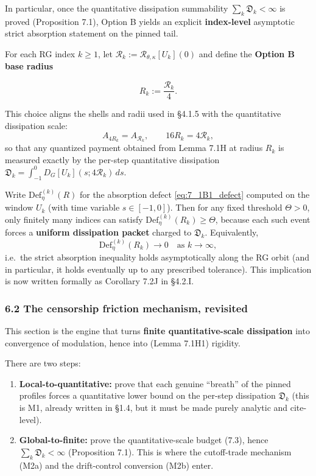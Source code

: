 \documentclass[
  11pt,
]{article}
\begin{document}
In particular, once the quantitative dissipation summability \(\sum_k\mathfrak D_k<\infty\) is proved (Proposition 7.1), Option B yields an explicit \textbf{index-level} asymptotic strict absorption statement on the pinned tail.

For each RG index \(k\ge1\), let \(\mathcal R_k:=\mathcal R_{\theta,\kappa}[U_k](0)\) and define the \textbf{Option B base radius}

\begin{equation}
R_k:=\frac{\mathcal R_k}{4}.
\tag{7.2B0}\label{eq:7_2B0_Rk_def}
\end{equation}

This choice aligns the shells and radii used in §4.1.5 with the quantitative dissipation scale: \[
A_{4R_k}=A_{\mathcal R_k},\qquad 16R_k = 4\mathcal R_k,
\] so that any quantized payment obtained from Lemma 7.1H at radius \(R_k\) is measured exactly by the per-step quantitative dissipation \(\mathfrak D_k=\int_{-1}^{0}D_G[U_k](s;4\mathcal R_k)\,ds\).

Write \(\mathrm{Def}^{(k)}_{\eta}(R)\) for the absorption defect \eqref{eq:7_1B1_defect} computed on the window \(U_k\) (with time variable \(s\in[-1,0]\)). Then for any fixed threshold \(\Theta>0\), only finitely many indices can satisfy \(\mathrm{Def}^{(k)}_{\eta}(R_k)\ge \Theta\), because each such event forces a \textbf{uniform dissipation packet} charged to \(\mathfrak D_k\). Equivalently, \[
\mathrm{Def}^{(k)}_{\eta}(R_k)\to 0\quad\text{as }k\to\infty,
\] i.e.~the strict absorption inequality holds asymptotically along the RG orbit (and in particular, it holds eventually up to any prescribed tolerance). This implication is now written formally as Corollary 7.2J in §4.2.I.

\hypertarget{the-censorship-friction-mechanism-revisited}{%
\subsubsection{6.2 The censorship friction mechanism, revisited}\label{the-censorship-friction-mechanism-revisited}}

This section is the engine that turns \textbf{finite quantitative-scale dissipation} into convergence of modulation, hence into (Lemma 7.1H1) rigidity.

There are two steps:

\begin{enumerate}
\def\labelenumi{\arabic{enumi}.}
\item
  \textbf{Local-to-quantitative:} prove that each genuine ``breath'' of the pinned profiles forces a quantitative lower bound on the per-step dissipation \(\mathfrak D_k\) (this is M1, already written in §1.4, but it must be made purely analytic and cite-level).
\item
  \textbf{Global-to-finite:} prove the quantitative-scale budget (7.3), hence \(\sum_k\mathfrak D_k<\infty\) (Proposition 7.1). This is where the cutoff-trade mechanism (M2a) and the drift-control conversion (M2b) enter.
\end{enumerate}
\end{document}
